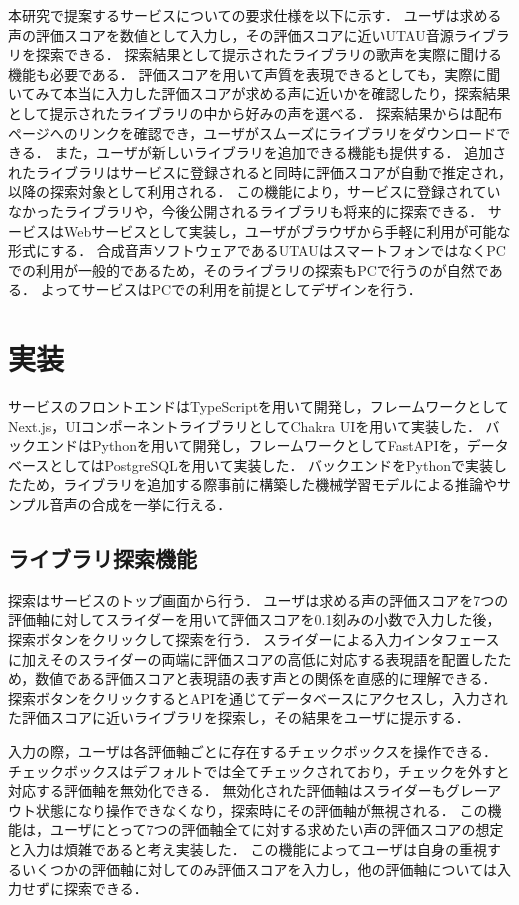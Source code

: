 本研究で提案するサービスについての要求仕様を以下に示す．
ユーザは求める声の評価スコアを数値として入力し，その評価スコアに近いUTAU音源ライブラリを探索できる．
探索結果として提示されたライブラリの歌声を実際に聞ける機能も必要である．
評価スコアを用いて声質を表現できるとしても，実際に聞いてみて本当に入力した評価スコアが求める声に近いかを確認したり，探索結果として提示されたライブラリの中から好みの声を選べる．
探索結果からは配布ページへのリンクを確認でき，ユーザがスムーズにライブラリをダウンロードできる．
また，ユーザが新しいライブラリを追加できる機能も提供する．
追加されたライブラリはサービスに登録されると同時に評価スコアが自動で推定され，以降の探索対象として利用される．
この機能により，サービスに登録されていなかったライブラリや，今後公開されるライブラリも将来的に探索できる．
サービスはWebサービスとして実装し，ユーザがブラウザから手軽に利用が可能な形式にする．
合成音声ソフトウェアであるUTAUはスマートフォンではなくPCでの利用が一般的であるため，そのライブラリの探索もPCで行うのが自然である．
よってサービスはPCでの利用を前提としてデザインを行う．

\section{実装}
サービスのフロントエンドはTypeScriptを用いて開発し，フレームワークとしてNext.js，UIコンポーネントライブラリとしてChakra UIを用いて実装した．
バックエンドはPythonを用いて開発し，フレームワークとしてFastAPIを，データベースとしてはPostgreSQLを用いて実装した．
バックエンドをPythonで実装したため，ライブラリを追加する際事前に構築した機械学習モデルによる推論やサンプル音声の合成を一挙に行える．

\subsection{ライブラリ探索機能}

探索はサービスのトップ画面から行う．
ユーザは求める声の評価スコアを7つの評価軸に対してスライダーを用いて評価スコアを0.1刻みの小数で入力した後，探索ボタンをクリックして探索を行う．
スライダーによる入力インタフェースに加えそのスライダーの両端に評価スコアの高低に対応する表現語を配置したため，数値である評価スコアと表現語の表す声との関係を直感的に理解できる．
探索ボタンをクリックするとAPIを通じてデータベースにアクセスし，入力された評価スコアに近いライブラリを探索し，その結果をユーザに提示する．

入力の際，ユーザは各評価軸ごとに存在するチェックボックスを操作できる．
チェックボックスはデフォルトでは全てチェックされており，チェックを外すと対応する評価軸を無効化できる．
無効化された評価軸はスライダーもグレーアウト状態になり操作できなくなり，探索時にその評価軸が無視される．
この機能は，ユーザにとって7つの評価軸全てに対する求めたい声の評価スコアの想定と入力は煩雑であると考え実装した．
この機能によってユーザは自身の重視するいくつかの評価軸に対してのみ評価スコアを入力し，他の評価軸については入力せずに探索できる．

